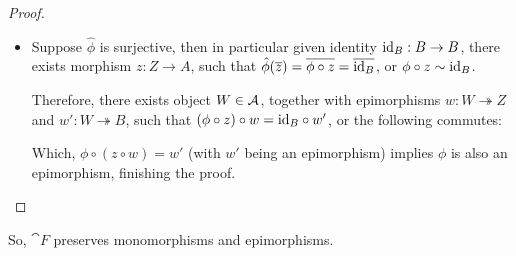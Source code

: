 \documentclass{article}
\begin{document}
\begin{proof}
\begin{itemize}
        For this, our beloved fibre product will do the job: Given $\phi:A\twoheadrightarrow B$ (epimorphism) and $z':Z\rightarrow B$, take the fibre product $A\times_B Z$ and morphisms $\phi':A\times_B Z\twoheadrightarrow Z$ (also epimorphism, since it's pullback of $\phi$) and $z':A\times_B Z\rightarrow A$, that satisfies the following diagram:
        \begin{center}
        \end{center}
        Whic, one has $(\phi\circ z')\circ \id = z\circ \phi'$, with $\id$ (of $A\times_B Z$) and $\phi'$ being epimorphisms, hence showing $\phi\circ z'\sim z$, finishing the proof that $\hat{\phi}$ is surjective.

        \item[$\impliedby$:] Suppose $\hat{\phi}$ is surjective, then in particular given identity $\mathrm{id}_B:B\rightarrow B$, there exists morphism $z:Z\rightarrow A$, such that $\hat{\phi}(\overline{z}) = \overline{\phi\circ z}=\overline{\mathrm{id}_B}$, or $\phi\circ z\sim \mathrm{id}_B$.
        
        Therefore, there exists object $W\in\cal{A}$, together with epimorphisms $w:W\twoheadrightarrow Z$ and $w':W\twoheadrightarrow B$, such that $(\phi\circ z)\circ w=\mathrm{id}_B\circ w'$, or the following commutes:
        \begin{center}
        \end{center}
        Which, $\phi \circ (z\circ w)=w'$ (with $w'$ being an epimorphism) implies $\phi$ is also an epimorphism, finishing the proof.
    \end{itemize}
\end{proof}

So, $\cat{F}$ preserves monomorphisms and epimorphisms.

\hfil
\end{document}
